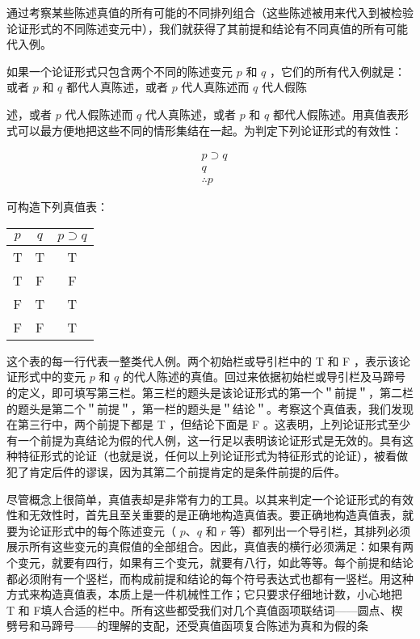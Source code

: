 通过考察某些陈述真值的所有可能的不同排列组合（这些陈述被用来代入到被检验论证形式的不同陈述变元中），我们就获得了其前提和结论有不同真值的所有可能代入例。

如果一个论证形式只包含两个不同的陈述变元 $p$ 和 $q$ ，它们的所有代入例就是：或者 $p$ 和 $q$ 都代人真陈述，或者 $p$ 代人真陈述而 $q$ 代人假陈

述，或者 $p$ 代人假陈述而 $q$ 代人真陈述，或者 $p$ 和 $q$ 都代人假陈述。用真值表形式可以最方便地把这些不同的情形集结在一起。为判定下列论证形式的有效性：

$$
\begin{aligned}
& p \supset q \\
& q \\
& \therefore p
\end{aligned}
$$

可构造下列真值表：

\begin{center}
\begin{tabular}{|ccc|}
\hline
$p$ & $q$ & $p \supset q$ \\
\hline
T & T & T \\
T & F & F \\
F & T & T \\
F & F & T \\
\hline
\end{tabular}
\end{center}

这个表的每一行代表一整类代人例。两个初始栏或导引栏中的 T 和 F ，表示该论证形式中的变元 $p$ 和 $q$ 的代人陈述的真值。回过来依据初始栏或导引栏及马蹄号的定义，即可填写第三栏。第三栏的题头是该论证形式的第一个＂前提＂，第二栏的题头是第二个＂前提＂，第一栏的题头是＂结论＂。考察这个真值表，我们发现在第三行中，两个前提下都是 T ，但结论下面是 F 。这表明，上列论证形式至少有一个前提为真结论为假的代人例，这一行足以表明该论证形式是无效的。具有这种特征形式的论证（也就是说，任何以上列论证形式为特征形式的论证），被看做犯了肯定后件的谬误，因为其第二个前提肯定的是条件前提的后件。

尽管概念上很简单，真值表却是非常有力的工具。以其来判定一个论证形式的有效性和无效性时，首先且至关重要的是正确地构造真值表。要正确地构造真值表，就要为论证形式中的每个陈述变元（ $p 、 q$ 和 $r$ 等）都列出一个导引栏，其排列必须展示所有这些变元的真假值的全部组合。因此，真值表的横行必须满足：如果有两个变元，就要有四行，如果有三个变元，就要有八行，如此等等。每个前提和结论都必须附有一个竖栏，而构成前提和结论的每个符号表达式也都有一竖栏。用这种方式来构造真值表，本质上是一件机械性工作；它只要求仔细地计数，小心地把 T 和 F填人合适的栏中。所有这些都受我们对几个真值函项联结词——圆点、楔劈号和马蹄号——的理解的支配，还受真值函项复合陈述为真和为假的条

